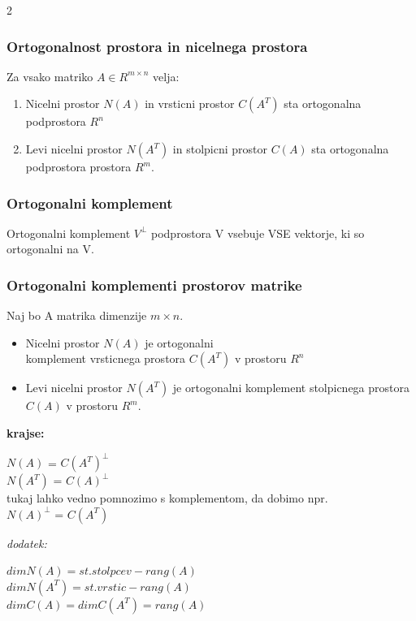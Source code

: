 \documentclass{article}
\begin{document}
\begin{multicols}{2}
	\subsubsection{Ortogonalnost prostora in nicelnega prostora}

	Za vsako matriko $A \in R^{m \times n}$ velja:
	\begin{enumerate}
		\item Nicelni prostor $N(A)$ in vrsticni prostor $C(A^{T})$ sta ortogonalna podprostora $R^{n}$
		\item Levi nicelni prostor $N(A^{T})$ in stolpicni prostor $C(A)$ sta ortogonalna podprostora prostora $R^{m}$.
	\end{enumerate}

	\subsubsection{Ortogonalni komplement}

	Ortogonalni komplement $V^{\perp}$ podprostora V vsebuje VSE vektorje, ki so ortogonalni na V.

	\subsubsection{Ortogonalni komplementi prostorov matrike}

	Naj bo A matrika dimenzije $m \times n$.
	\begin{itemize}
		\item Nicelni prostor $N(A)$ je ortogonalni\\ komplement vrsticnega prostora $C(A^{T})$ v prostoru $R^{n}$
		\item Levi nicelni prostor $N(A^{T})$ je ortogonalni komplement stolpicnega prostora $C(A)$ v prostoru $R^{m}$.
	\end{itemize}
	\textbf{krajse:}
	\begin{center}
		$N(A)$ = $C(A^{T})^{\perp}$\\
		$N(A^{T})$ = $C(A)^{\perp}$ \\
		tukaj lahko vedno pomnozimo s komplementom, da dobimo npr.\\
		$N(A)^{\perp}$ = $C(A^{T})$
	\end{center}
	\textit{dodatek:}
	\begin{center}
		$dim N(A) = st. stolpcev - rang(A)$\\
		$dim N(A^{T}) = st. vrstic - rang(A)$\\
		$dim C(A) = dim C(A^{T}) = rang(A)$
	\end{center}


\end{multicols}
\end{document}
